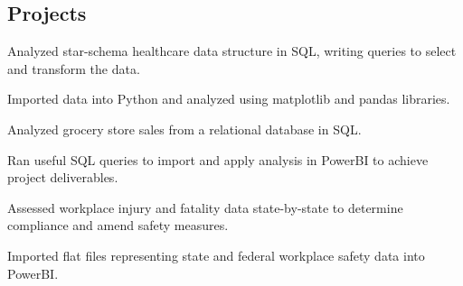 \documentclass[]{plushcv}
\begin{document}
\begin{paracol}{2}

\section{Projects}

\begin{tightemize}
	\item Analyzed star-schema healthcare data structure in SQL, writing queries to select and transform the data.
	\item  Imported data into Python and analyzed using matplotlib and pandas libraries.
\end{tightemize}
\sectionsep

\begin{tightemize}
	\item Analyzed grocery store sales from a relational database in SQL.
	\item Ran useful SQL queries to import and apply analysis in PowerBI to achieve project deliverables.
\end{tightemize}
\sectionsep

\begin{tightemize}
\item Assessed workplace injury and fatality data state-by-state to determine compliance and amend safety measures.
\item Imported flat files representing state and federal workplace safety data into PowerBI.
\end{tightemize}
\sectionsep


%
%


\end{paracol}
\end{document}
